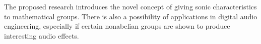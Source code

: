 \documentclass[10pt]{article}
\begin{document}
\vskip5mm

The proposed research introduces the novel concept of giving sonic
characteristics to mathematical groups.  There is also a possibility of
applications in digital audio engineering, especially if certain nonabelian
groups are shown to produce interesting audio effects. 
 
\vskip5mm
\end{document}
